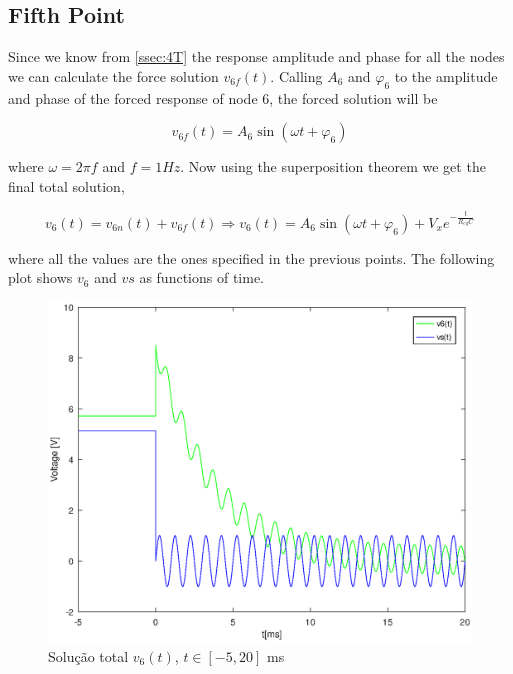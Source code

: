 \begin{table}[H]
\centering
\begin{tabularx}{1.0\textwidth} {
  | >{\raggedright\arraybackslash}X
  | >{\centering\arraybackslash}X
  | >{\centering\arraybackslash}X
  | >{\raggedleft\arraybackslash}X | }
 \hline

\end{tabularx}
\end{table}

\vspace{5mm}

\subsection{Fifth Point}
\label{ssec:5T}

\par Since we know from \ref{ssec:4T} the response amplitude and phase for all the nodes we can calculate the force solution $v_{6f}(t)$. Calling $A_6$ and $\varphi _6$ to the amplitude and phase of the forced response of node 6, the forced solution will be 

\begin{equation}
  v_{6f}(t) = A_6 \sin(\omega t + \varphi _6)
  \label{eq:fsol}
\end{equation}

where $\omega=2\pi f$ and $f=1Hz$. Now using the superposition theorem we get the final total solution,

\begin{equation}
  v_{6}(t) = v_{6n}(t)+v_{6f}(t) \Rightarrow v_{6}(t) = A_6 \sin(\omega t + \varphi _6) + V_x e^{-\frac{t}{R_{eq}C}}
  \label{eq:gensol}
\end{equation}

where all the values are the ones specified in the previous points. The following plot shows $v_6$ and $vs$ as functions of time.

\begin{figure}[H] \centering
\includegraphics[width=0.7\linewidth]{general_solution.eps}
\caption{Solução total $v_{6}(t)$, $t\in[-5,20]$ ms}
\label{fig:gensol}
\end{figure}

